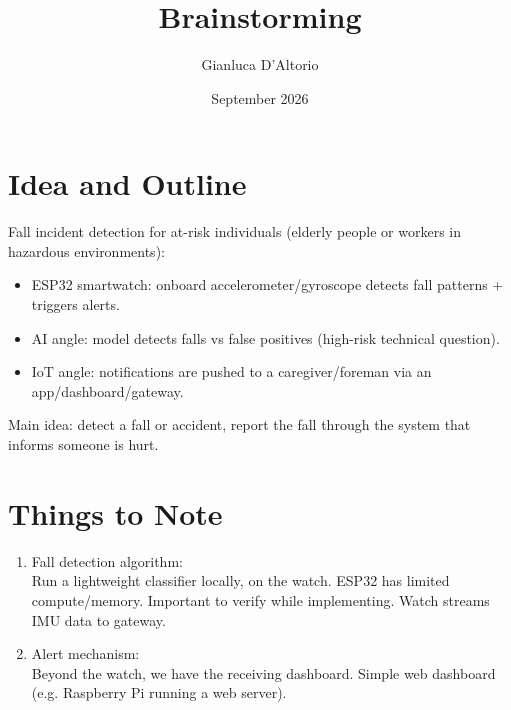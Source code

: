 \documentclass{article}
\title{Brainstorming}
\author{Gianluca D'Altorio}
\date{September 2026}
\begin{document}
\maketitle

\section{Idea and Outline}
Fall incident detection for at-risk individuals (elderly people or workers in hazardous environments):
\begin{itemize}
    \item ESP32 smartwatch: onboard accelerometer/gyroscope detects fall patterns + triggers alerts.
    \item AI angle: model detects falls vs false positives (high-risk technical question).
    \item IoT angle: notifications are pushed to a caregiver/foreman via an app/dashboard/gateway. 
\end{itemize}

Main idea: detect a fall or accident, report the fall through the system that informs someone is hurt.

\section{Things to Note}
\begin{enumerate}
    \item Fall detection algorithm:\\
        Run a lightweight classifier locally, on the watch.  ESP32 has limited compute/memory.  Important to verify while implementing.  Watch streams IMU data to gateway.
    \item Alert mechanism:\\
        Beyond the watch, we have the receiving dashboard.  Simple web dashboard (e.g. Raspberry Pi running a web server). 
\end{enumerate}
\end{document}

